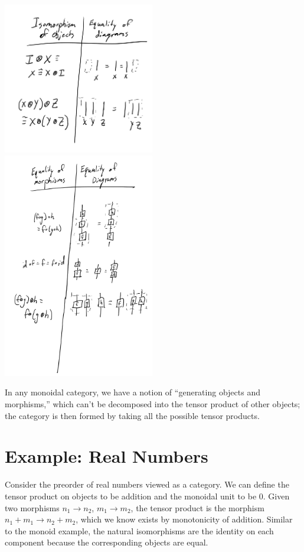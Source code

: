 \begin{center}
  \includegraphics[width=250px]{fig/monoidal-categories-isos.png}
  \includegraphics[width=250px]{fig/monoidal-categories-morphisms.png}
\end{center}

In any monoidal category, we have a notion of ``generating objects and
morphisms,'' which can't be decomposed into the tensor product of other
objects; the category is then formed by taking all the possible tensor
products.

\section{Example: Real Numbers}

Consider the preorder of real numbers viewed as a category. We can
define the tensor product on objects to be addition and the monoidal
unit to be 0. Given two morphisms \(n_1 \to n_2\), \(m_1 \to m_2\), the
tensor product is the morphism \(n_1 + m_1 \to n_2 + m_2\), which we
know exists by monotonicity of addition. Similar to the monoid example,
the natural isomorphisms are the identity on each component because the
corresponding objects are equal.

